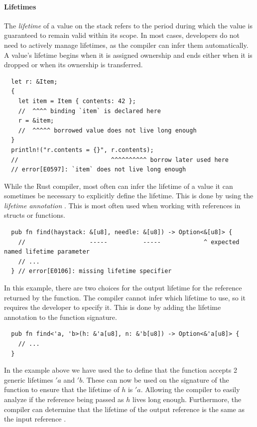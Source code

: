 \documentclass[11pt]{report}
\theoremstyle{definition}
\theoremstyle{plain}
\begin{document}
\paragraph{Lifetimes}
The \textit{lifetime} of a value on the stack refers to the period during which the value is guaranteed to remain valid within its scope. In most cases, developers do not need to actively manage lifetimes, as the compiler can infer them automatically. A value's lifetime begins when it is assigned ownership and ends either when it is dropped or when its ownership is transferred.
\begin{verbatim}
  let r: &Item;
  {
    let item = Item { contents: 42 };
    //  ^^^^ binding `item` is declared here
    r = &item;
    //  ^^^^^ borrowed value does not live long enough
  }
  println!("r.contents = {}", r.contents);
  //                          ^^^^^^^^^^ borrow later used here
  // error[E0597]: `item` does not live long enough
\end{verbatim}
While the Rust compiler, most often can infer the lifetime of a value it can sometimes be necessary to explicitly define the lifetime. This is done by using the \textit{lifetime annotation} . This is most often used when working with references in structs or functions.
\begin{verbatim}
  pub fn find(haystack: &[u8], needle: &[u8]) -> Option<&[u8]> {
    //                  -----          -----            ^ expected named lifetime parameter
    // ...
  } // error[E0106]: missing lifetime specifier
\end{verbatim}
In this example, there are two choices for the output lifetime for the reference returned by the function. The compiler cannot infer which lifetime to use, so it requires the developer to specify it. This is done by adding the lifetime annotation to the function signature.
\begin{verbatim}
  pub fn find<'a, 'b>(h: &'a[u8], n: &'b[u8]) -> Option<&'a[u8]> {
    // ...
  }
\end{verbatim}
In the example above we have used the  to define that the function accepts 2 generic lifetimes $'a$ and $'b$. These can now be used on the signature of the function to ensure that the lifetime of $h$ is $'a$. Allowing the compiler to easily analyze if the reference being passed as $h$ lives long enough.
Furthermore, the compiler can determine that the lifetime of the output reference is the same as the input reference .
\end{document}
